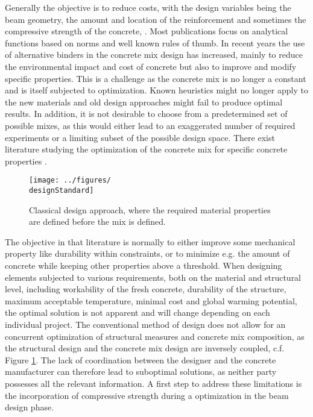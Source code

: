 Generally the objective is to reduce costs, with the design variables being the beam geometry, the amount and location of the reinforcement and sometimes the compressive strength of the concrete, \cite{Chakrabarty_1992, Coello_1997, Pierott_2021, Shobeiri_2023} .
Most publications focus on analytical functions based on norms and well known rules of thumb.
In recent years the use of alternative binders in the concrete mix design has increased, mainly to reduce the environmental impact and cost of concrete but also to improve and modify specific properties.
This is a challenge as the concrete mix is no longer a constant and is itself subjected to optimization.
Known heuristics might no longer apply to the new materials and old design approaches might fail to produce optimal results.
In addition, it is not desirable to choose from a predetermined set of possible mixes, as this would either lead to an exaggerated number of required experiments or a limiting subset of the possible design space.
There exist literature studying the optimization of the concrete mix for specific concrete properties \cite{Lisienkova_2021, Kondapally_2022}.
\begin{figure}[b]%
	\centering
	\texttt{[image: ../figures/\\designStandard]}
	\caption{Classical design approach, where the required material properties are defined before the mix is defined.}\label{fig:standard_design}
\end{figure}
The objective in that literature is normally to either improve some mechanical property like durability within constraints, or to minimize e.g. the amount of concrete while keeping other properties above a threshold.
When designing elements subjected to various requirements, both on the material and structural level, including workability of the fresh concrete, durability of the structure, maximum acceptable temperature, minimal cost and global warming potential, the optimal solution is not apparent and will change depending on each individual project.
The conventional method of design does not allow for an concurrent optimization of structural measures and concrete mix composition, as the structural  design and the concrete mix design are inversely coupled, c.f. Figure \ref{fig:standard_design}.
The lack of coordination between the designer and the concrete manufacturer can therefore lead to suboptimal solutions, as neither party possesses all the relevant information.
A first step to address these limitations is the incorporation of compressive strength during a optimization in the beam design phase.

